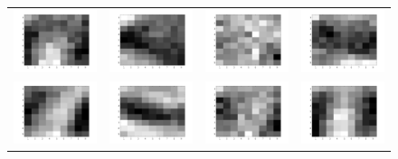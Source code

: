 \documentclass{article} %
\begin{document}
\begin{figure}[H]
\begin{tabular}{cccc}
\\
\includegraphics[width=0.2\linewidth]{images/Fig_grey_9.png}
&
\includegraphics[width=0.2\linewidth]{images/Fig_grey_10.png}
&
\includegraphics[width=0.2\linewidth]{images/Fig_grey_11.png}
&
\includegraphics[width=0.2\linewidth]{images/Fig_grey_12.png}
\\
\includegraphics[width=0.2\linewidth]{images/Fig_grey_13.png}
&
\includegraphics[width=0.2\linewidth]{images/Fig_grey_14.png}
&
\includegraphics[width=0.2\linewidth]{images/Fig_grey_15.png}
&
\includegraphics[width=0.2\linewidth]{images/Fig_grey_16.png}

\end{tabular}
\end{figure}
\end{document}
